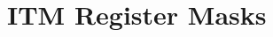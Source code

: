 \hypertarget{group___i_t_m___register___masks}{}\section{I\+T\+M Register Masks}
\label{group___i_t_m___register___masks}
